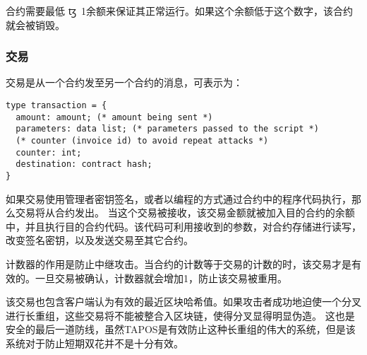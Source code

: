 \documentclass[letterpaper]{article}
\newcommand{\tz}{{\fontspec{DejaVu Sans} \small{ꜩ}}}
\begin{document}
合约需要最低\tz~\num{1}余额来保证其正常运行。如果这个余额低于这个数字，该合约就会被销毁。
\subsubsection{交易}

交易是从一个合约发至另一个合约的消息，可表示为：

\begin{lstlisting}
type transaction = {
  amount: amount; (* amount being sent *)
  parameters: data list; (* parameters passed to the script *)
  (* counter (invoice id) to avoid repeat attacks *)
  counter: int;
  destination: contract hash;
}
\end{lstlisting}

如果交易使用管理者密钥签名，或者以编程的方式通过合约中的程序代码执行，那么交易将从合约发出。
当这个交易被接收，该交易金额就被加入目的合约的余额中，并且执行目的合约代码。该代码可利用接收到的参数，对合约存储进行读写，改变签名密钥，以及发送交易至其它合约。

计数器的作用是防止中继攻击。当合约的计数等于交易的计数的时，该交易才是有效的。一旦交易被确认，计数器就会增加1，防止该交易被重用。

该交易也包含客户端认为有效的最近区块哈希值。如果攻击者成功地迫使一个分叉进行长重组，这些交易将不能被整合入区块链，使得分叉显得明显伪造。
这也是安全的最后一道防线，虽然TAPOS是有效防止这种长重组的伟大的系统，但是该系统对于防止短期双花并不是十分有效。
\end{document}
